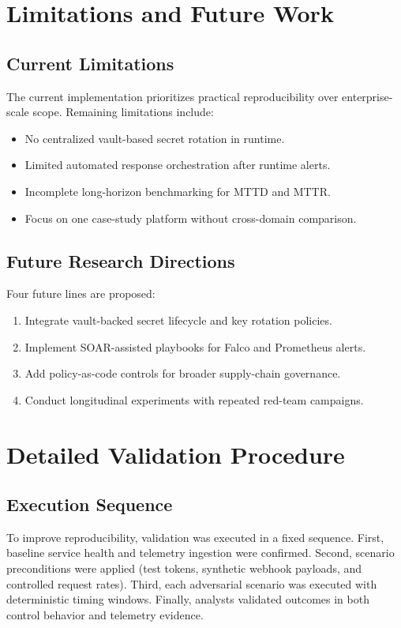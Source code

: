 \documentclass[conference]{IEEEtran}
\begin{document}
\section{Limitations and Future Work}
\subsection{Current Limitations}
The current implementation prioritizes practical reproducibility over enterprise-scale scope. Remaining limitations include:
\begin{itemize}
\item No centralized vault-based secret rotation in runtime.
\item Limited automated response orchestration after runtime alerts.
\item Incomplete long-horizon benchmarking for MTTD and MTTR.
\item Focus on one case-study platform without cross-domain comparison.
\end{itemize}

\subsection{Future Research Directions}
Four future lines are proposed:
\begin{enumerate}
\item Integrate vault-backed secret lifecycle and key rotation policies.
\item Implement SOAR-assisted playbooks for Falco and Prometheus alerts.
\item Add policy-as-code controls for broader supply-chain governance.
\item Conduct longitudinal experiments with repeated red-team campaigns.
\end{enumerate}

\section{Detailed Validation Procedure}
\subsection{Execution Sequence}
To improve reproducibility, validation was executed in a fixed sequence. First, baseline service health and telemetry ingestion were confirmed. Second, scenario preconditions were applied (test tokens, synthetic webhook payloads, and controlled request rates). Third, each adversarial scenario was executed with deterministic timing windows. Finally, analysts validated outcomes in both control behavior and telemetry evidence.
\end{document}
